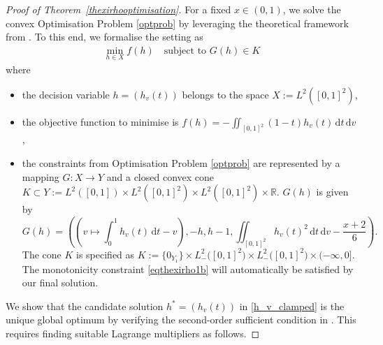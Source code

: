 \documentclass{article}
\theoremstyle{plain}
\theoremstyle{definition}
\newcommand{\de}{\mathrm{\,d}}
\begin{document}
\begin{proof}[Proof of Theorem~\ref{thexirhooptimisation}]
For a fixed \(x \in (0,1)\), we solve the convex Optimisation Problem \ref{optprob} by leveraging the theoretical framework from \cite[Chap.~3]{bonnans2013perturbation}.
To this end, we formalise the setting as 
\begin{align}\label{eqformalminprob}
    \min_{h \in X} f(h) \quad \text{subject to } G(h)\in K
\end{align}
where
\begin{itemize}
    \item the decision variable \(h = (h_v(t))\) belongs to the space \(X := L^2([0,1]^2)\),
    \item the objective function to minimise is \(f(h) = -\iint_{[0,1]^2} (1-t)h_v(t)\de t\de v \),
    \item the constraints from Optimisation Problem \ref{optprob} are represented by a mapping \(G:X \to Y\) and a closed convex cone \(K \subset Y := L^2([0,1]) \times L^2([0,1]^2) \times L^2([0,1]^2) \times \mathbb{R}\). \(G(h)\) is given by
    \[ G(h) = \left( \left(v \mapsto \int_0^1 h_v(t)\de t - v\right), -h, h-1, \iint_{[0,1]^2} h_v(t)^2\de t\de v - \frac{x+2}{6} \right). \]
    The cone \(K\) is specified as \(K := \{0_{Y_1}\}\times L_{-}^{2}\bigl([0,1]^{2}\bigr)\times L_{-}^{2}\bigl([0,1]^{2}\bigr)\times(-\infty,0]\). The monotonicity constraint \eqref{eqthexirho1b} will automatically be satisfied by our final solution.
\end{itemize}
We show that the candidate solution \(h^*=(h_v(t))\) in \eqref{h_v_clamped} is the unique global optimum by verifying the second-order sufficient condition in \cite[Thm.~3.63]{bonnans2013perturbation}. This requires finding suitable Lagrange multipliers as follows.


\end{proof}
\end{document}

